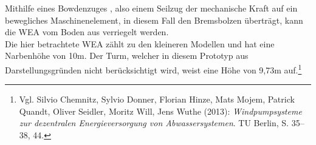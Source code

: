 Mithilfe eines Bowdenzuges , also einem Seilzug der mechanische Kraft auf ein bewegliches Maschinenelement, in diesem Fall den Bremsbolzen überträgt, kann die WEA vom Boden aus verriegelt werden. \\
Die hier betrachtete WEA zählt zu den kleineren Modellen und hat eine Narbenhöhe von 10m. Der Turm, welcher in diesem Prototyp aus Darstellungsgründen nicht berücksichtigt wird, weist eine Höhe von 9,73m auf.\footnote{Vgl. Silvio Chemnitz, Sylvio Donner, Florian Hinze, Mats Mojem, Patrick Quandt, Oliver Seidler, Moritz Will, Jens Wuthe (2013): \textit{Windpumpsysteme zur dezentralen Energieversorgung von Abwassersystemen}. TU Berlin, S. 35--38, 44.} 
   


